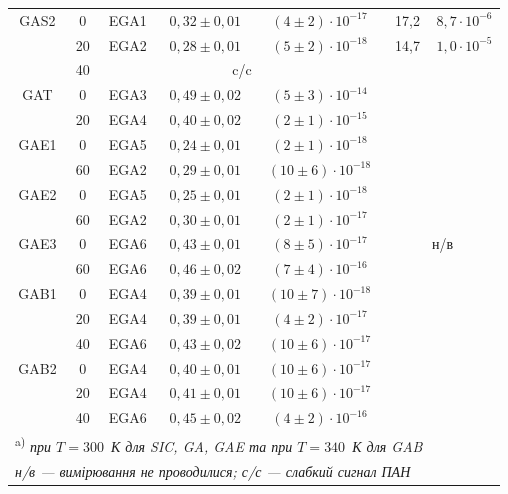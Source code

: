 \documentclass[a4paper,14pt,oneside,openany]{memoir}
\begin{document}
\begin{table}
\begin{tabular}{|c|c|c|c|c|c|c|}
GAS2& 0 &EGA1& $0,32\pm0,01$ &$(4\pm2)\cdot10^{-17}$&17,2&$8,7\cdot10^{-6}$\\ \cline{2-7}
& 20 &EGA2& $0,28\pm0,01$ &$(5\pm2)\cdot10^{-18}$&14,7&$1,0\cdot10^{-5}$\\ \cline{2-7}
& 40 & \multicolumn{3}{c|}{c/c}&\multicolumn{2}{c|}{}\\ \cline{1-5}
GAT& 0 &EGA3& $0,49\pm0,02$ &$(5\pm3)\cdot10^{-14}$&\multicolumn{2}{c|}{}\\ \cline{2-5}
& 20 &EGA4& $0,40\pm0,02$ &$(2\pm1)\cdot10^{-15}$&\multicolumn{2}{c|}{}\\ \cline{1-5}
GAE1& 0 &EGA5& $0,24\pm0,01$ &$(2\pm1)\cdot10^{-18}$&\multicolumn{2}{c|}{}\\ \cline{2-5}
& 60 &EGA2& $0,29\pm0,01$ &$(10\pm6)\cdot10^{-18}$&\multicolumn{2}{c|}{}\\ \cline{1-5}
GAE2& 0 &EGA5& $0,25\pm0,01$ &$(2\pm1)\cdot10^{-18}$&\multicolumn{2}{c|}{}\\ \cline{2-5}
& 60 &EGA2& $0,30\pm0,01$ &$(2\pm1)\cdot10^{-17}$&\multicolumn{2}{c|}{}\\ \cline{1-5}
GAE3& 0 &EGA6& $0,43\pm0,01$ &$(8\pm5)\cdot10^{-17}$&\multicolumn{2}{c|}{н/в}\\ \cline{2-5}
& 60 &EGA6& $0,46\pm0,02$ &$(7\pm4)\cdot10^{-16}$&\multicolumn{2}{c|}{}\\ \cline{1-5}
GAB1& 0 &EGA4& $0,39\pm0,01$ &$(10\pm7)\cdot10^{-18}$&\multicolumn{2}{c|}{}\\ \cline{2-5}
& 20 &EGA4& $0,39\pm0,01$ &$(4\pm2)\cdot10^{-17}$&\multicolumn{2}{c|}{}\\ \cline{2-5}
& 40 &EGA6& $0,43\pm0,02$ &$(10\pm6)\cdot10^{-17}$&\multicolumn{2}{c|}{}\\ \cline{1-5}
GAB2& 0 &EGA4& $0,40\pm0,01$ &$(10\pm6)\cdot10^{-17}$&\multicolumn{2}{c|}{}\\ \cline{2-5}
& 20 &EGA4& $0,41\pm0,01$ &$(10\pm6)\cdot10^{-17}$&\multicolumn{2}{c|}{}\\ \cline{2-5}
& 40 &EGA6& $0,45\pm0,02$ &$(4\pm2)\cdot10^{-16}$&\multicolumn{2}{c|}{}\\  \hline
\multicolumn{6}{l}{\textsuperscript{ a)} \emph{при $T=300$~К для SIC, GA, GAE та при  $T=340$~К для GAB}}\\
\multicolumn{6}{l}{\emph{н/в --- вимірювання не проводилися; с/с --- слабкий сигнал ПАН}}\\
\end{tabular}
\end{table}
\end{document}
